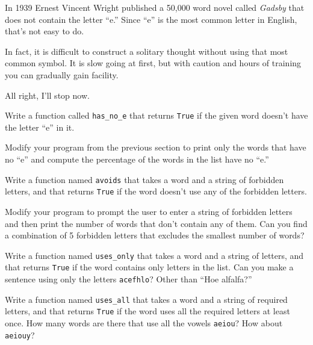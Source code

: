 \documentclass[10pt]{book}
\begin{document}
\begin{CJK}{UTF8}{gbsn}
\begin{exercise}
In 1939 Ernest Vincent Wright published a 50,000 word novel called
{\em Gadsby} that does not contain the letter ``e.''  Since ``e'' is
the most common letter in English, that's not easy to do.

In fact, it is difficult to construct a solitary thought without using
that most common symbol.  It is slow going at first, but with caution
and hours of training you can gradually gain facility.

All right, I'll stop now.

Write a function called \verb"has_no_e" that returns {\tt True} if
the given word doesn't have the letter ``e'' in it.

Modify your program from the previous section to print only the words
that have no ``e'' and compute the percentage of the words in the list
have no ``e.''

\end{exercise}


\begin{exercise} 

Write a function named {\tt avoids}
that takes a word and a string of forbidden letters, and
that returns {\tt True} if the word doesn't use any of the forbidden
letters.

Modify your program to prompt the user to enter a string
of forbidden letters and then print the number of words that
don't contain any of them.
Can you find a combination of 5 forbidden letters that
excludes the smallest number of words?

\end{exercise}



\begin{exercise}

Write a function named \verb"uses_only" that takes a word and a
string of letters, and that returns {\tt True} if the word contains
only letters in the list.  Can you make a sentence using only the
letters {\tt acefhlo}?  Other than ``Hoe alfalfa?''

\end{exercise}


\begin{exercise} 

Write a function named \verb"uses_all" that takes a word and a
string of required letters, and that returns {\tt True} if the word
uses all the required letters at least once.  How many words are there
that use all the vowels {\tt aeiou}?  How about {\tt aeiouy}?


\end{exercise}
\end{CJK}
\end{document}
